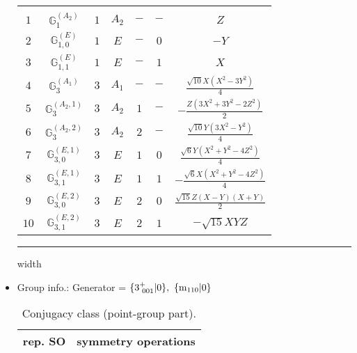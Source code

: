 \documentclass[fleqn,10pt,landscape]{article}
\begin{document}
\begin{itemize}
\begin{center}
\begin{longtable}{ccccccc}
 \hline \hline
\multicolumn{6}{r}{} \\ \endlastfoot

$ 1 $ & $ \mathbb{G}_{1}^{(A_{2})} $ & $ 1 $ & $ A_{2} $ & $ - $ & $ - $ & $ Z $ \\
$ 2 $ & $ \mathbb{G}_{1,0}^{(E)} $ & $ 1 $ & $ E $ & $ - $ & $ 0 $ & $ - Y $ \\
$ 3 $ & $ \mathbb{G}_{1,1}^{(E)} $ & $ 1 $ & $ E $ & $ - $ & $ 1 $ & $ X $ \\ \hline
$ 4 $ & $ \mathbb{G}_{3}^{(A_{1})} $ & $ 3 $ & $ A_{1} $ & $ - $ & $ - $ & $ \frac{\sqrt{10} X \left(X^{2} - 3 Y^{2}\right)}{4} $ \\
$ 5 $ & $ \mathbb{G}_{3}^{(A_{2},1)} $ & $ 3 $ & $ A_{2} $ & $ 1 $ & $ - $ & $ - \frac{Z \left(3 X^{2} + 3 Y^{2} - 2 Z^{2}\right)}{2} $ \\
$ 6 $ & $ \mathbb{G}_{3}^{(A_{2},2)} $ & $ 3 $ & $ A_{2} $ & $ 2 $ & $ - $ & $ \frac{\sqrt{10} Y \left(3 X^{2} - Y^{2}\right)}{4} $ \\
$ 7 $ & $ \mathbb{G}_{3,0}^{(E,1)} $ & $ 3 $ & $ E $ & $ 1 $ & $ 0 $ & $ \frac{\sqrt{6} Y \left(X^{2} + Y^{2} - 4 Z^{2}\right)}{4} $ \\
$ 8 $ & $ \mathbb{G}_{3,1}^{(E,1)} $ & $ 3 $ & $ E $ & $ 1 $ & $ 1 $ & $ - \frac{\sqrt{6} X \left(X^{2} + Y^{2} - 4 Z^{2}\right)}{4} $ \\
$ 9 $ & $ \mathbb{G}_{3,0}^{(E,2)} $ & $ 3 $ & $ E $ & $ 2 $ & $ 0 $ & $ \frac{\sqrt{15} Z \left(X - Y\right) \left(X + Y\right)}{2} $ \\
$ 10 $ & $ \mathbb{G}_{3,1}^{(E,2)} $ & $ 3 $ & $ E $ & $ 2 $ & $ 1 $ & $ - \sqrt{15} X Y Z $ \\
\end{longtable}
\end{center}

 \hfil \hrule height 1mm width \textwidth \hfil

\item Group info.: Generator = $\{3^{+}_{\,\,001}|0\},\,\,\{{\rm m}_{110}|0\}$

\begin{center}
\renewcommand{\arraystretch}{1.3}
\begin{longtable}{c|l}
\caption{Conjugacy class (point-group part).}
 \\
 \hline \hline
rep. SO & symmetry operations \\ \hline \endfirsthead


\end{longtable}
\end{center}
\end{itemize}
\end{document}
